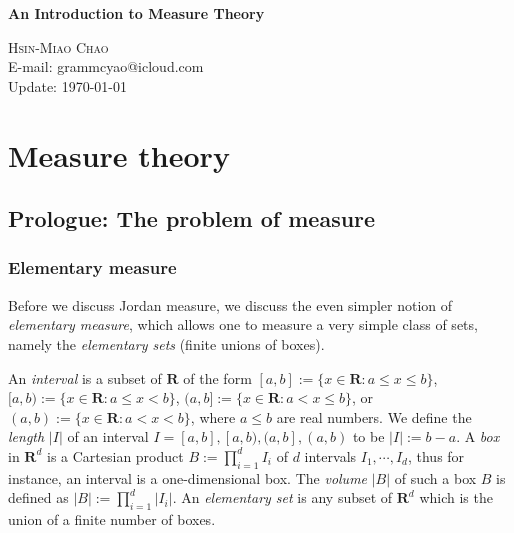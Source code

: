 \documentclass{book}
\theoremstyle{defstyle}
\theoremstyle{thmstyle}
\begin{document}
\setlength{\headheight}{14pt}
\large
\setlength\parindent{2em}

\begin{titlepage}
   {\indent\fontsize{30pt}{0pt}\textbf{An Introduction to Measure Theory}}

   \vfill
   {\indent\small{\textsc{Hsin-Miao Chao}}}\\%
   {\indent\small{E-mail: grammcyao@icloud.com}}\\
   {\indent\small{Update: \today}}
\end{titlepage}

\thispagestyle{empty}
\tableofcontents
\thispagestyle{empty}
\cleardoublepage
\setcounter{page}{1}

\chapter{Measure theory}
\section{Prologue: The problem of measure}

\subsection{Elementary measure}

Before we discuss Jordan measure, we discuss the even simpler notion of \emph{elementary measure}, which allows one to measure a very simple class of sets, namely the \emph{elementary sets} (finite unions of boxes).

\begin{definition}\label{def:intervals, boxes, elementary sets}
    An \emph{interval} is a subset of $\mathbf{R}$ of the form $[a, b] := \{x \in \mathbf{R} : a \leq x \leq b\}$, $[a, b) := \{x \in \mathbf{R} : a \leq x < b\}$, $(a, b] := \{x \in \mathbf{R} : a < x \leq b\}$, or $(a, b) := \{x \in \mathbf{R} : a < x < b\}$, where $a \leq b$ are real numbers. We define the \emph{length} $|I|$ of an interval $I = [a, b], [a, b), (a, b], (a, b)$ to be $|I| := b - a$. A \emph{box} in $\mathbf{R}^d$ is a Cartesian product $B := \prod_{i = 1}^{d} I_i$ of $d$ intervals $I_1, \cdots, I_d$, thus for instance, an interval is a one-dimensional box. The \emph{volume} $|B|$ of such a box $B$ is defined as $|B| := \prod_{i = 1}^{d} |I_i|$. An \emph{elementary set} is any subset of $\mathbf{R}^d$ which is the union of a finite number of boxes.
\end{definition}
\end{document}
